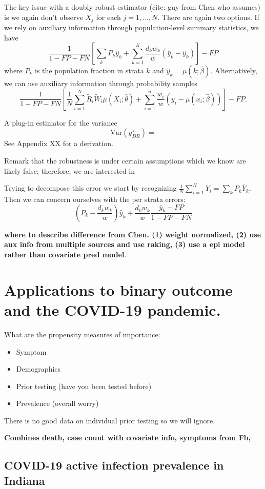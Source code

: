 \documentclass[11pt]{amsart}
\begin{document}
The key issue with a doubly-robust estimator (cite: guy from Chen who assumes) is we again don't observe $X_j$ for each $j=1,\ldots,N$. There are again two options.  If we rely on auxiliary information through population-level summary statistics, we have
$$
\frac{1}{1 - FP - FN} \left[ \sum_{k} P_k \hat y_k + \sum_{k=1}^K \frac{d_k w_k}{w} (\bar y_k - \hat y_k) \right] - FP
$$
where $P_k$ is the population fraction in strata $k$ and $\hat y_k = \mu(k; \hat \beta)$. Alternatively, we can use auxiliary information through probability samples
$$
\frac{1}{1-FP-FN} \left[ \frac{1}{N} \sum_{i=1}^N \tilde R_i \tilde W_i \mu (X_i; \hat \theta) + \sum_{i=1}^n \frac{w_i}{w} \left(y_i - \mu(x_i; \hat \beta)\right) \right] - FP.
$$

A plug-in estimator for the variance
$$
\text{Var} (\bar y_{DR}^\star) =
$$
See Appendix XX for a derivation.

Remark that the robustness is under certain assumptions which we know are likely false; therefore, we are interested in

Trying to decompose this error we start by recognizing $\frac{1}{N} \sum_{i=1}^N Y_i = \sum_k P_k \bar Y_k$.  Then we can concern ourselves with the per strata errors:
$$
\left( P_k - \frac{d_k w_k}{w} \right) \hat y_k + \frac{d_k w_k}{w} \frac{\bar y_k - FP}{1-FP-FN}
$$

{\bf where to describe difference from Chen. (1) weight normalized, (2) use aux info from multiple sources and use raking, (3) use a epi model rather than covariate pred model}.

\section{Applications to binary outcome and the COVID-19 pandemic.}
\label{section:applications}

What are the propensity measures of importance:
\begin{itemize}
	\item Symptom
	\item Demographics
	\item Prior testing (have you been tested before)
	\item Prevalence (overall worry)
\end{itemize}
There is no good data on individual prior testing so we will ignore.

{\bf Combines death, case count with covariate info, symptoms from Fb,  }

\subsection{COVID-19 active infection prevalence in Indiana}
\end{document}
